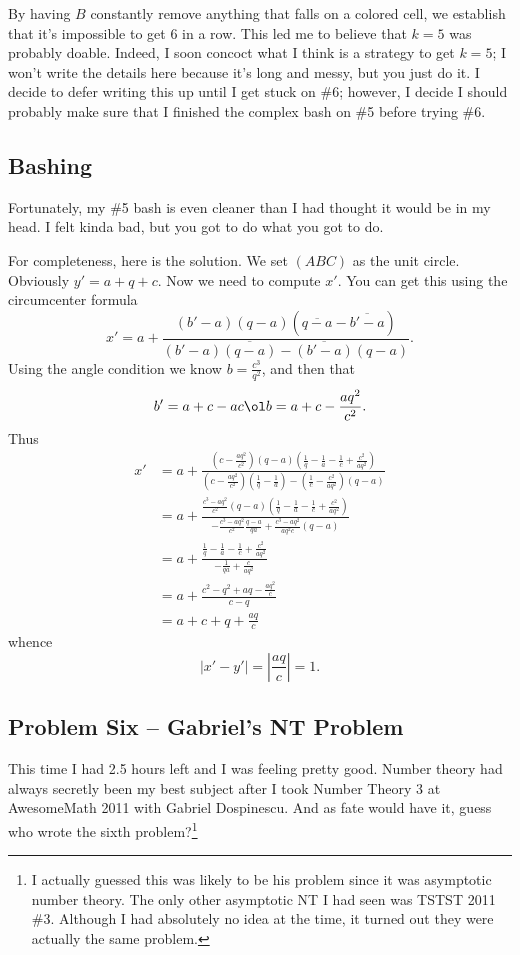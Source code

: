 \documentclass[11pt]{scrartcl}
\begin{document}
By having $B$ constantly remove anything that falls on a colored cell, we establish that it's impossible to get $6$ in a row.
This led me to believe that $k=5$ was probably doable.
Indeed, I soon concoct what I think is a strategy to get $k=5$; I won't write the details here because it's long and messy, but you just do it.
I decide to defer writing this up until I get stuck on \#6; however, I decide I should probably make sure that I finished the complex bash on \#5 before trying \#6.


\subsection{Bashing}
Fortunately, my \#5 bash is even cleaner than I had thought it would be in my head.
I felt kinda bad, but you got to do what you got to do. %

For completeness, here is the solution.
We set $(ABC)$ as the unit circle.
Obviously $y' = a + q + c$. Now we need to compute $x'$. You can get this using the circumcenter formula \[ x' = a + \frac{(b'-a)(q-a)\left( \overline{q-a}-\overline{b'-a} \right)}{(b'-a)\overline{(q-a)} - \overline{(b'-a)}(q-a)}. \]
Using the angle condition we know $b = \frac{c^3}{q^2}$, and then that \[ b' = a+c - ac\ol b = a+c-\frac{aq^2}{c^2}. \]
Thus \begin{align*}
  x' &= a + \frac{\left( c-\frac{aq^2}{c^2} \right)\left( q-a \right)\left( \frac 1q - \frac 1a - \frac 1c + \frac{c^2}{aq^2}  \right)}{\left( c-\frac{aq^2}{c^2} \right)\left( \frac 1q - \frac 1a \right) - \left( \frac 1c - \frac{c^2}{aq^2} \right)\left( q-a \right)} \\
  &= a + \frac{\frac{c^3-aq^2}{c^2} \left( q-a \right)\left( \frac 1q - \frac 1a - \frac 1c + \frac{c^2}{aq^2} \right)}{-\frac{c^3-aq^2}{c^2}\frac{q-a}{qa} + \frac{c^3-aq^2}{aq^2c}(q-a)} \\
  &= a + \frac{\frac 1q - \frac 1a - \frac 1c + \frac{c^2}{aq^2}}{-\frac{1}{qa} + \frac{c}{aq^2}} \\
  &= a + \frac{c^2-q^2 + aq-\frac{aq^2}{c}}{c-q} \\
  &= a + c + q + \frac{aq}{c}
\end{align*} whence \[ \left\lvert x'-y' \right\rvert = \left\lvert \frac{aq}{c} \right\rvert = 1.\]

\subsection{Problem Six -- Gabriel's NT Problem}
This time I had 2.5 hours left and I was feeling pretty good.
Number theory had always secretly been my best subject after I took Number Theory 3 at AwesomeMath 2011 with Gabriel Dospinescu.
And as fate would have it, guess who wrote the sixth problem?\footnote{I actually guessed this was likely to be his problem since it was asymptotic number theory. The only other asymptotic NT I had seen was TSTST 2011 \#3. Although I had absolutely no idea at the time, it turned out they were actually the same problem.}
\end{document}
